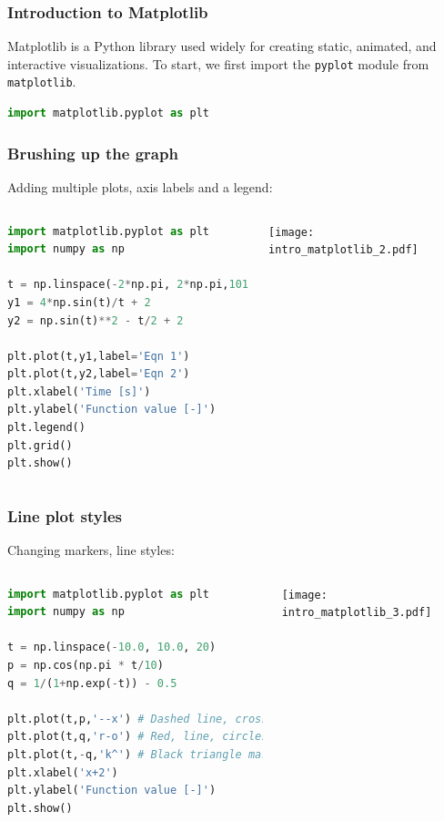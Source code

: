 \begin{frame}[fragile]
  \frametitle{Introduction to Matplotlib}
  Matplotlib is a Python library used widely for creating static, animated, and interactive visualizations. To start, we first import the \lstinline{pyplot} module from \lstinline{matplotlib}.\pause
  
  \begin{lstlisting}[language=Python]
import matplotlib.pyplot as plt
  \end{lstlisting}\pause
  
\end{frame}

\begin{frame}[fragile]
  \frametitle{Brushing up the graph}
  Adding multiple plots, axis labels and a legend:
  \begin{columns}
    \begin{lstlisting}[language=Python]
import matplotlib.pyplot as plt
import numpy as np

t = np.linspace(-2*np.pi, 2*np.pi,101)
y1 = 4*np.sin(t)/t + 2
y2 = np.sin(t)**2 - t/2 + 2

plt.plot(t,y1,label='Eqn 1')
plt.plot(t,y2,label='Eqn 2')
plt.xlabel('Time [s]')
plt.ylabel('Function value [-]')
plt.legend()
plt.grid()
plt.show()
    \end{lstlisting}\pause
      \texttt{[image: intro\_matplotlib\_2.pdf]}
  \end{columns}
\end{frame}

\begin{frame}[fragile]
  \frametitle{Line plot styles}
  Changing markers, line styles:
  \begin{columns}
    \begin{lstlisting}[language=Python]
import matplotlib.pyplot as plt
import numpy as np

t = np.linspace(-10.0, 10.0, 20)
p = np.cos(np.pi * t/10) 
q = 1/(1+np.exp(-t)) - 0.5

plt.plot(t,p,'--x') # Dashed line, cross
plt.plot(t,q,'r-o') # Red, line, circles
plt.plot(t,-q,'k^') # Black triangle marker
plt.xlabel('x+2')
plt.ylabel('Function value [-]')
plt.show()
    \end{lstlisting}\pause
      \texttt{[image: intro\_matplotlib\_3.pdf]}
  \end{columns}
\end{frame}

